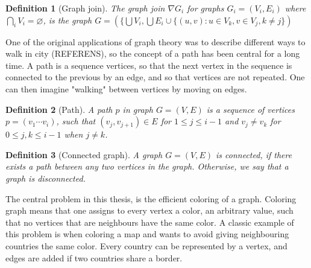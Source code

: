 \documentclass{amsart}
\newtheorem{definition}{Definition}[section]
\begin{document}
\begin{definition}[Graph join]
    The graph join $\nabla G_i$ for graphs $G_i = (V_i,E_i)$ where 
    $\bigcap_i V_i = \varnothing$, is the graph $G = (\{\bigcup V_i,
    \bigcup E_i \cup \{(u,v) : u \in V_k, v \in V_j, k \neq j \})$
\end{definition}


One of the original applications of graph theory was to describe different ways
to walk in city (REFERENS), so the concept of a path has been central for a long
time.  A path is a sequence vertices, so that the next vertex in the sequence is
connected to the previous by an edge, and so that vertices are not repeated.
One can then imagine "walking" between vertices by moving on edges.

\begin{definition}[Path]
    A path $p$ in graph $G = (V,E)$ is a sequence of vertices $p = (v_1\cdots
    v_i)$, such that $(v_j,v_{j+1}) \in E$ for $1 \leq j \leq i-1$ and $v_j \neq v_k$ 
    for $0 \leq j,k \leq i-1$ when $j \neq k$.
\end{definition}

\begin{definition}[Connected graph]
    A graph $G = (V,E)$ is connected, if there exists a path between any two
    vertices in the graph. Otherwise, we say that a graph is disconnected.
\end{definition}

The central problem in this thesis, is the efficient coloring of a graph.
Coloring graph means that one assigns to every vertex a color, an arbitrary
value, such that no vertices that are neighbours have the same color. A classic
example of this problem is when coloring a map and wants to avoid giving
neighbouring countries the same color.  Every country can be represented by a
vertex, and edges are added if two countries share a border.
\end{document}
